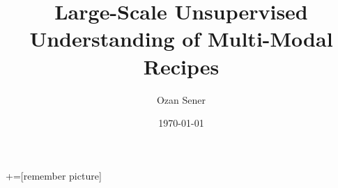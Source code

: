 \documentclass[12 pt,aspectratio=85]{beamer}
\author[Ozan Sener\quad {os79@cornell.edu}]{Ozan Sener}
\title[Recipe Understanding]{Large-Scale Unsupervised Understanding of Multi-Modal Recipes}
\institute{}
\date{\today}
\begin{document}

+=[remember picture]





%
\end{document}
